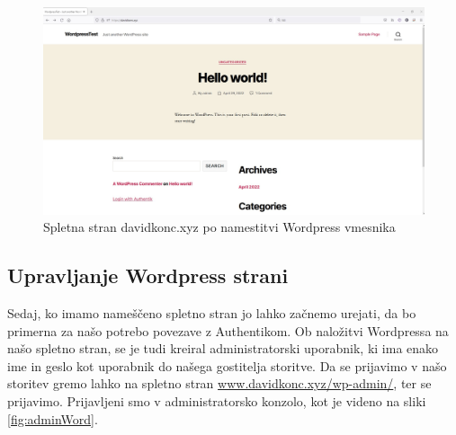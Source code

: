 \documentclass[a4paper,12pt,openright]{book}
\begin{document}
\begin{figure}[H]
\hspace{-4cm}
\includegraphics[scale=0.50]{diploma-FRI-vzorec_11maj2021/wordpress.jpg}
\caption{Spletna stran davidkonc.xyz po namestitvi Wordpress vmesnika}
\label{fig:wordpressOsn}
\end{figure}



\subsection{Upravljanje Wordpress strani}

Sedaj, ko imamo nameščeno spletno stran jo lahko začnemo urejati, da bo primerna za našo potrebo povezave z Authentikom. Ob naložitvi Wordpressa na našo spletno stran, se je tudi kreiral administratorski uporabnik, ki ima enako ime in geslo kot uporabnik do našega gostitelja storitve. Da se prijavimo v našo storitev gremo lahko na spletno stran \href{www.davidkonc.xyz/wp-admin/}{www.davidkonc.xyz/wp-admin/}, ter se prijavimo.
\newline
Prijavljeni smo v administratorsko konzolo, kot je videno na sliki \ref{fig:adminWord}.
\end{document}
